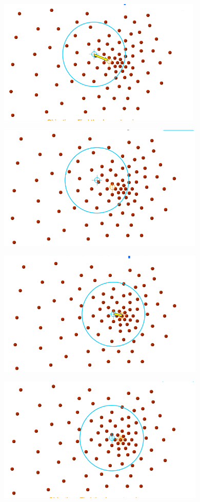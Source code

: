 \documentclass[12pt,fleqn]{article}\usepackage{../common}
\begin{document}
\includegraphics[height=6cm]{mean_3.png}

\includegraphics[height=6cm]{mean_4.png}

\includegraphics[height=6cm]{mean_5.png}

\includegraphics[height=6cm]{mean_6.png}
\end{document}
